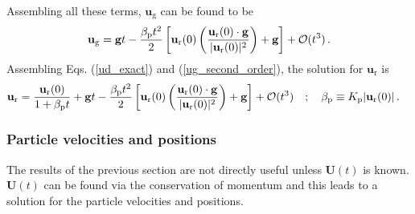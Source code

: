Assembling all these terms, $\mathbf{u}_\text{g}$ can be found to be
\begin{align}
    \label{ug_second_order}
    \mathbf{u}_\text{g} = \mathbf{g} t - \frac{\beta_{\rm p} t^2}{2} \left[\mathbf{u}_{\text{r}}(0) \left(\frac{\mathbf{u}_{\text{r}}(0) \cdot \mathbf{g}}{|\mathbf{u}_{\text{r}}(0)|^2}\right) + \mathbf{g}\right] + \mathcal{O}(t^3) \,.
\end{align}
Assembling Eqs. (\ref{ud_exact}) and (\ref{ug_second_order}), the solution for $\mathbf{u}_\text{r}$ is
\begin{align}
    \label{ur_short}
    \mathbf{u}_\text{r} &= \frac{\mathbf{u}_{\text{r}}(0)}{1 + \beta_{\rm p} t} + \mathbf{g} t - \frac{\beta_{\rm p} t^2}{2} \left[\mathbf{u}_{\text{r}}(0) \left(\frac{\mathbf{u}_{\text{r}}(0) \cdot \mathbf{g}}{|\mathbf{u}_{\text{r}}(0)|^2}\right) + \mathbf{g}\right] + \mathcal{O}(t^3) \quad ; \quad \beta_{\rm p} \equiv K_{\rm p} |\mathbf{u}_{\text{r}}(0)| \,. %
\end{align}

\subsubsection*{Particle velocities and positions}

The results of the previous section are not directly useful unless $\mathbf{U}(t)$ is known. $\mathbf{U}(t)$ can be found via the conservation of momentum and this leads to a solution for the particle velocities and positions.

